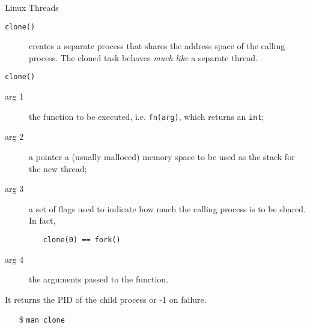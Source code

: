 \begin{frame}{Linux Threads}
  \begin{description}
  \item[\texttt{clone()}] creates a separate process that shares the address space of the
    calling process. The cloned task behaves \emph{much like} a separate thread.
  \end{description}
  \begin{center}
  \end{center}
\end{frame}

\begin{frame}{\texttt{clone()}}
  \begin{center}
  \end{center}
  \begin{small}
    \begin{description}
    \item[arg 1] the function to be executed, i.e. \texttt{fn(arg)}, which returns an \texttt{int};
    \item[arg 2] a pointer {\pright} a (usually malloced) memory space to be used as
      the stack for the new thread;
    \item[arg 3] a set of flags used to indicate how much the calling process is to be
      shared. In fact,
      \begin{itemize}
      \item[]  \texttt{clone(0) == fork()}
      \end{itemize}
    \item[arg 4] the arguments passed to the function.
    \end{description}
    It returns the PID of the child process or -1 on failure.
  \end{small}
  \begin{itemize}
    \item[\$] \texttt{man clone}
  \end{itemize}
\end{frame}

